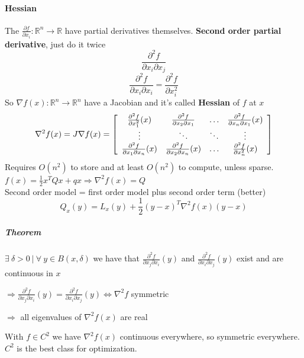 \documentclass[10pt]{report}
\begin{document}
\paragraph{Hessian} The $\frac{\partial f}{\partial x_i}:\mathbb{R}^n\rightarrow \mathbb{R}$ have partial derivatives themselves. \textbf{Second order partial derivative}, just do it twice $$\frac{\partial^2 f}{\partial x_i \partial x_j}$$ $$\frac{\partial^2 f}{\partial x_i \partial x_i}=\frac{\partial^2 f}{\partial x_i^2}$$
So $\nabla f(x) : \mathbb{R}^n \rightarrow \mathbb{R}^n$ have a Jacobian and it's called \textbf{Hessian} of $f$ at $x$
$$\nabla^2 f(x) = J\nabla f(x) = \left[ \begin{array}{c c c c}
\frac{\partial^2 f}{\partial x_1^2}(x) & \frac{\partial^2 f}{\partial x_2\partial x_1} & \ldots & \frac{\partial^2 f}{\partial x_n\partial x_1}(x)\\
\vdots&\ddots&\ddots&\vdots\\
\frac{\partial^2 f}{\partial x_1\partial x_n}(x) & \frac{\partial^2 f}{\partial x_2\partial x_n}(x) & \ldots & \frac{\partial^2 f}{\partial x_n^2}(x)\\
\end{array}\right]$$
Requires $O(n^2)$ to store and at least $O(n^2)$ to compute, unless sparse.\\
$f(x) = \frac{1}{2}x^TQx + qx \Rightarrow \nabla^2 f(x) = Q$\\
Second order model = first order model plus second order term (better)
$$Q_x(y) = L_x(y) + \frac{1}{2}(y-x)^T\nabla^2f(x)(y-x)$$
\subparagraph{Theorem} $\exists\:\delta>0\:|\:\forall\:y\in B(x, \delta)$ we have that $\frac{\partial^2 f}{\partial x_j\partial x_i}(y)$ and $\frac{\partial^2 f}{\partial x_i\partial x_j}(y)$ exist and are continuous in $x$\begin{list}{}{}
	\item $\Rightarrow \frac{\partial^2 f}{\partial x_j\partial x_i}(y) = \frac{\partial^2 f}{\partial x_i\partial x_j}(y) \Leftrightarrow \nabla^2 f$ symmetric
	\item $\Rightarrow$ all eigenvalues of $\nabla^2 f(x)$ are real
\end{list}
With $f\in C^2$ we have $\nabla^2 f(x)$ continuous everywhere, so symmetric everywhere. $C^2$ is the best class for optimization.
\end{document}
